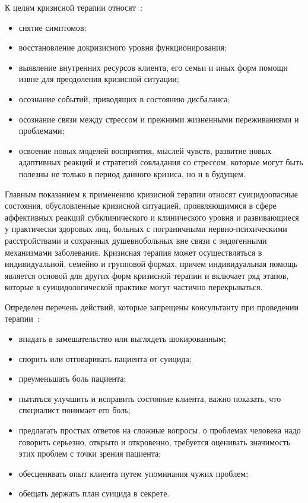 К целям кризисной терапии относят~\cite{rappo}:

\begin{itemize}
	\item снятие симптомов;
	\item восстановление докризисного уровня функционирования;
	\item выявление внутренних ресурсов клиента, его семьи и иных форм помощи извне для преодоления кризисной ситуации;
	\item осознание событий, приводящих в состоянию дисбаланса;
	\item осознание связи между стрессом и прежними жизненными переживаниями и проблемами;
	\item освоение новых моделей восприятия, мыслей чувств, развитие новых адаптивных реакций и стратегий совладания со стрессом, которые могут быть полезны не только в период данного кризиса, но и в будущем.
\end{itemize}

Главным показанием к применению кризисной терапии относят суицидоопасные состояния, обусловленные кризисной ситуацией, проявляющимися в сфере аффективных реакций субклинического и клинического уровня и развивающиеся у практически здоровых лиц, больных с пограничными нервно-психическими расстройствами и сохранных душевнобольных вне связи с эндогенными механизмами заболевания. Кризисная терапия может осуществляться в индивидуальной, семейно и групповой формах, причем индивидуальная помощь является основой для других форм кризисной терапии и включает ряд этапов, которые в суицидологической практике могут частично перекрываться.~\cite{starsen}

Определен перечень действий, которые запрещены консультанту при проведении терапии~\cite{solov}:
\begin{itemize}
	\item впадать в замешательство или выглядеть шокированным;
	\item спорить или отговаривать пациента от суицида;
	\item преуменьшать боль пациента;
	\item пытаться улучшить и исправить состояние клиента, важно показать, что специалист понимает его боль;
	\item предлагать простых ответов на сложные вопросы, о проблемах человека надо говорить серьезно, открыто и откровенно, требуется оценивать значимость этих проблем с точки зрения пациента;
	\item обесценивать опыт клиента путем упоминания чужих проблем;
	\item обещать держать план суицида в секрете.
\end{itemize}

